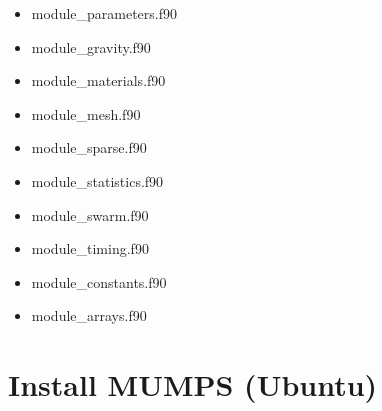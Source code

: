 \begin{itemize}
\item {\filenamefont module\_parameters.f90}\\


\item {\filenamefont module\_gravity.f90}\\


\item {\filenamefont module\_materials.f90}\\


\item {\filenamefont module\_mesh.f90}\\


\item {\filenamefont module\_sparse.f90}\\


\item {\filenamefont module\_statistics.f90}\\


\item {\filenamefont module\_swarm.f90}\\


\item {\filenamefont module\_timing.f90}\\


\item {\filenamefont module\_constants.f90}\\


\item {\filenamefont module\_arrays.f90}\\

\end{itemize}

\section{Install MUMPS (Ubuntu)}

